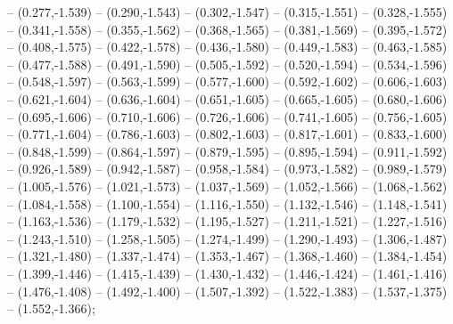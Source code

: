 -- (0.277,-1.539) -- (0.290,-1.543) -- (0.302,-1.547) -- (0.315,-1.551) -- (0.328,-1.555) -- (0.341,-1.558) -- (0.355,-1.562) -- (0.368,-1.565) -- (0.381,-1.569) -- (0.395,-1.572) -- (0.408,-1.575) -- (0.422,-1.578) -- (0.436,-1.580) -- (0.449,-1.583) -- (0.463,-1.585) -- (0.477,-1.588) -- (0.491,-1.590) -- (0.505,-1.592) -- (0.520,-1.594) -- (0.534,-1.596) -- (0.548,-1.597) -- (0.563,-1.599) -- (0.577,-1.600) -- (0.592,-1.602) -- (0.606,-1.603) -- (0.621,-1.604) -- (0.636,-1.604) -- (0.651,-1.605) -- (0.665,-1.605) -- (0.680,-1.606) -- (0.695,-1.606) -- (0.710,-1.606) -- (0.726,-1.606) -- (0.741,-1.605) -- (0.756,-1.605) -- (0.771,-1.604) -- (0.786,-1.603) -- (0.802,-1.603) -- (0.817,-1.601) -- (0.833,-1.600) -- (0.848,-1.599) -- (0.864,-1.597) -- (0.879,-1.595) -- (0.895,-1.594) -- (0.911,-1.592) -- (0.926,-1.589) -- (0.942,-1.587) -- (0.958,-1.584) -- (0.973,-1.582) -- (0.989,-1.579) -- (1.005,-1.576) -- (1.021,-1.573) -- (1.037,-1.569) -- (1.052,-1.566) -- (1.068,-1.562) -- (1.084,-1.558) -- (1.100,-1.554) -- (1.116,-1.550) -- (1.132,-1.546) -- (1.148,-1.541) -- (1.163,-1.536) -- (1.179,-1.532) -- (1.195,-1.527) -- (1.211,-1.521) -- (1.227,-1.516) -- (1.243,-1.510) -- (1.258,-1.505) -- (1.274,-1.499) -- (1.290,-1.493) -- (1.306,-1.487) -- (1.321,-1.480) -- (1.337,-1.474) -- (1.353,-1.467) -- (1.368,-1.460) -- (1.384,-1.454) -- (1.399,-1.446) -- (1.415,-1.439) -- (1.430,-1.432) -- (1.446,-1.424) -- (1.461,-1.416) -- (1.476,-1.408) -- (1.492,-1.400) -- (1.507,-1.392) -- (1.522,-1.383) -- (1.537,-1.375) -- (1.552,-1.366);
